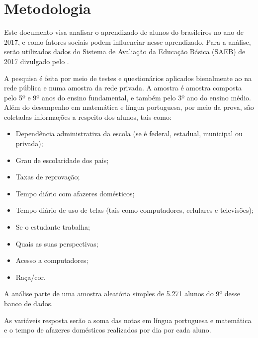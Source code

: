 


\chapter{Metodologia}

Este documento visa analisar o aprendizado de alunos do brasileiros no ano de 2017,
e como fatores sociais podem influenciar nesse aprendizado. Para a análise, serão utilizados dados
do Sistema de Avaliação da Educação Básica (SAEB) de 2017 divulgado pelo .

A pesquisa é feita por meio de testes e questionários aplicados bienalmente ao na rede pública
e numa amostra da rede privada. A amostra é amostra composta pelo 5º e 9º anos do ensino fundamental, e também
pelo 3º ano do ensino médio. Além do desempenho em matemática e língua portuguesa, por meio da prova,
são coletadas informações a respeito dos alunos, tais como:
    
    \begin{itemize}
        \item Dependência administrativa da escola (se é federal, estadual, municipal ou privada);
        \item Grau de escolaridade dos pais; 
        \item Taxas de reprovação;
        \item Tempo diário com afazeres domésticos;
        \item Tempo diário de uso de telas (tais como computadores, celulares e televisões);
        \item Se o estudante trabalha;
        \item Quais as suas perspectivas;
        \item Acesso a computadores;
        \item Raça/cor.
    \end{itemize}


A análise parte de uma amostra aleatória simples de 5.271 alunos do 9º desse banco de dados.

As variáveis resposta serão a soma das notas em língua portuguesa e matemática e o tempo de afazeres domésticos realizados por dia por cada aluno.

